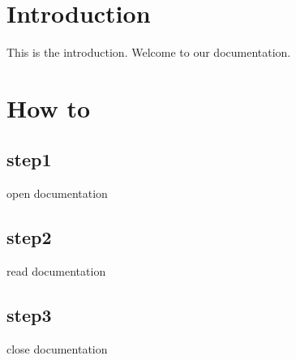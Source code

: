 \hypertarget{index_intro_sec}{}\section{Introduction}\label{index_intro_sec}
This is the introduction. Welcome to our documentation.\hypertarget{index_how_to}{}\section{How to}\label{index_how_to}
\hypertarget{index_step1}{}\subsection{step1}\label{index_step1}
open documentation \hypertarget{index_step2}{}\subsection{step2}\label{index_step2}
read documentation \hypertarget{index_step3}{}\subsection{step3}\label{index_step3}
close documentation  